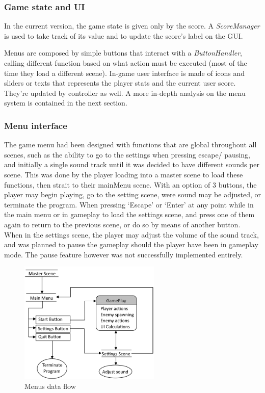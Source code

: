 \documentclass[11pt]{article}
\begin{document}
\subsubsection{Game state and UI}
In the current version, the game state is given only by the score. A \textit{ScoreManager} is used to take track of its value and to update the score's label on the GUI.

Menus are composed by simple buttons that interact with a \textit{ButtonHandler}, calling different function based on what action must be executed (most of the time they load a different scene).
In-game user interface is made of icons and sliders or texts that represents the player stats and the current user score. They're updated by controller as well. A more in-depth analysis on the menu system is contained in the next section.

\subsubsection{Menu interface}
The game menu had been designed with functions that are global throughout all scenes, such as the ability to go to the settings when pressing escape/ pausing, and initially a single sound track until it was decided to have different sounds per scene. This was done by the player loading into a master scene to load these functions, then strait to their mainMenu scene. 
With an option of 3 buttons, the player may begin playing, go to the setting scene, were sound may be adjusted, or terminate the program. When pressing ‘Escape’ or ‘Enter’ at any point while in the main menu or in gameplay to load the settings scene, and press one of them again to return to the previous scene, or do so by means of another button. 
When in the settings scene, the player may adjust the volume of the sound track, and was planned to pause the gameplay should the player have been in gameplay mode. The pause feature however was not successfully implemented entirely.

\begin{figure}[H]
  \centering
  \includegraphics[width=0.6\textwidth]{figures/menu_system}
  \caption{Menus data flow}
\end{figure}
\end{document}
